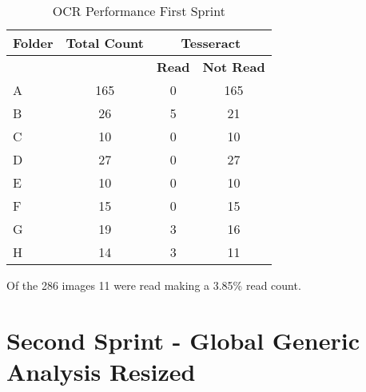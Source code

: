 \begin{table}[h]
    \centering
    \caption{OCR Performance First Sprint}
    \label{tab:first_sprint}
    \begin{tabular}{|l|c|c|c|}
        \hline
        \textbf{Folder} & \textbf{Total Count} & \multicolumn{2}{c|}{\textbf{Tesseract}}                     \\
        \hline
                        &                      & \textbf{Read}                           & \textbf{Not Read} \\
        \hline
        A               & 165                  & 0                                       & 165               \\
        B               & 26                   & 5                                       & 21                \\
        C               & 10                   & 0                                       & 10                \\
        D               & 27                   & 0                                       & 27                \\
        E               & 10                   & 0                                       & 10                \\
        F               & 15                   & 0                                       & 15                \\
        G               & 19                   & 3                                       & 16                \\
        H               & 14                   & 3                                       & 11                \\
        \hline
    \end{tabular}
\end{table}



Of the 286 images 11 were read making a 3.85\% read count.


\section{Second Sprint - Global Generic Analysis Resized}


